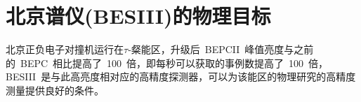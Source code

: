 \begin{comment}
升级后的~BEPCII~是一个多束团的双环对撞机。双环指的是正负电子束流分别注入在两个彼此独立的储存环中，经加速后在对撞点发生对撞。多束团对撞可以大幅度的提高亮度。BEPCII~的峰值亮度设计为在~1.89Gev~处达~1$\times$$10^{33}$$cm^{-2}$$s^{-1}$。高亮度意味着可以获得大量的物理事例，为诸多基于巨大统计量的物理过程的研究和分析提供良好的实验基础。表~\ref{tbl:event-Number}~列出了~BEPCII~运行一年可以累积的各种物理事例数。
\begin{table}[h]
    \centering
    \caption{\label{tbl:event-Number} BEPCII运行一年可以积累的事例数}
    \footnotesize
    \begin{tabular}{llllc}
        \hline
        物理& 质心系能量& 峰值亮度& 物理截面& 每年产生事例数 \\
             &(Gev)      &($10^{33} $$cm^{-2}$$s^{-1}$)& (nb)\\
        \hline
        $J/\psi$& 3.097& 0.6& ～3400&  10$\times$$10^{9}$ \\
        $\tau$&   3.670& 1.0& ～2.4&    12$\times$$10^{6}$ \\
        $\psi'$&  3.686& 1.0& ～640&    3$\times$$10^{9}$\\
        D&        3.770& 1.0& ～6.5&    32$\times$$10^{6}$\\
        $D_{s}$&   4.040& 0.6& ～0.32&   1$\times$$10^{6}$\\
        $D_{s}$&   4.160& 0.6& ～1.0&    3$\times$$10^{6}$\\
        \hline
    \end{tabular}
\end{table}

\section{~BESIII~物理目标}
~BEPCII~运行在~$\tau$~-粲能区($\approx$~3~Gev),BESIII~是运行在~BEPCII~上的大型通用探测器，通过收集~$\tau$~-粲能区的正负电子对撞产生的末态粒子进行~$\tau$~-粲物理研究。BESIII~主要研究的物理目标有：轻强子谱、粲物理、QCD~与~$\tau$~物理~\cite{wangyf2011}~\cite{chaokt:2009}。
\end{comment}

\section{北京谱仪(BESIII)的物理目标}
北京正负电子对撞机运行在$\tau$-粲能区，升级后~BEPCII~峰值亮度与之前的~BEPC~相比提高了~100~倍，即每秒可以获取的事例数提高了~100~倍，BESIII~是与此高亮度相对应的高精度探测器，可以为该能区的物理研究的高精度测量提供良好的条件。

